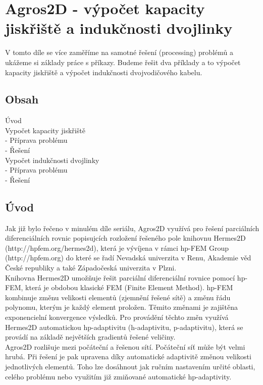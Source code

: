 \documentclass[a4paper, oneside]{article}
\begin{document}
\author{Bc. František MACH, Ing. Pavel Karban, Ph.D.}
\date{\today}
\section{Agros2D - výpočet kapacity jiskřiště a indukčnosti dvojlinky}
V tomto díle se více zaměříme na samotné řešení (processing) problémů a ukážeme si základy práce s příkazy. Budeme řešit dva příklady a to výpočet kapacity jiskřiště a výpočet indukčnosti dvojvodičového kabelu.
\subsection{Obsah}
Úvod\\
Vypočet kapacity jiskřiště\\
 - Příprava problému\\
 - Řešení\\
Vypočet indukčnosti dvojlinky\\
 - Příprava problému\\
 - Řešení\\
 \subsection{Úvod}
Jak již bylo řečeno v minulém díle seriálu, Agros2D využívá pro řešení parciálních diferenciálních rovnic popisujcích rozložení řešeného pole knihovnu Hermes2D (http://hpfem.org/hermes2d), která je vývíjena v rámci hp-FEM Group (http://hpfem.org) do které se řadí Nevadská univerzita v Renu, Akademie věd České republiky a také Západočeská univerzita v Plzni.\\
Knihovna Hermes2D umožňuje řešit parciální diferenciální rovnice pomocí hp-FEM, která je obdobou klasické FEM (Finite Element Method). hp-FEM kombinuje změnu velikosti elementů (zjemnění řešené sítě) a změnu řádu polynomu, kterým je každý element proložen. Těmito změnami je zajištěna exponencielní konvergence výsledků. Pro provádění těchto změn využívá Hermes2D automatickou hp-adaptivitu (h-adaptivitu, p-adaptivitu), která se provádí na základě největších gradientů řešené veličiny.\\
Agros2D rozlišuje mezi počáteční a řešenou sítí. Počáteční síť může být velmi hrubá. Při řešení je pak upravena díky automatické adaptivitě změnou velikosti jednotlivých elementů. Toho lze dosáhnout jak ručním nastavením určité oblasti, celého problému nebo využitím již zmiňované automatické hp-adaptivity.\\
\end{document}
